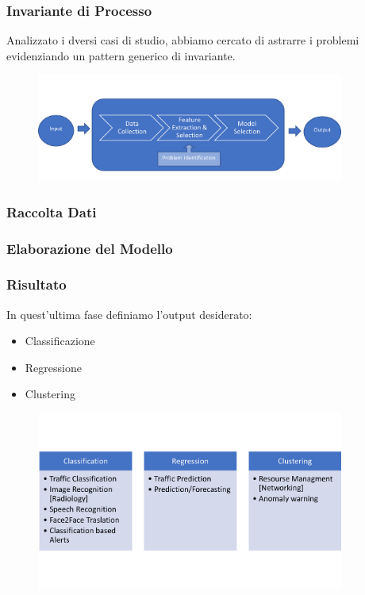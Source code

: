 \documentclass[xcolor=dvipsnames]{beamer}
\begin{document}
\begin{frame}
    \frametitle{Invariante di Processo}
    Analizzato i dversi casi di studio, abbiamo cercato di astrarre i problemi evidenziando un pattern generico di invariante.
    \begin{figure}[htbp]
        \includegraphics[width=0.9\textwidth]{Immagine3.png}
    \end{figure}
\end{frame}

\begin{frame}
    \frametitle{Raccolta Dati}
\end{frame}

\begin{frame}
    \frametitle{Elaborazione del Modello}
\end{frame}

\begin{frame}
    \frametitle{Risultato}
    In quest'ultima fase definiamo l'output desiderato:
    \begin{itemize}
        \item Classificazione
        \item Regressione 
        \item Clustering
    \end{itemize}
    \begin{figure}
        \includegraphics[width=0.9\textwidth , height=0.7\textheight]{categoryML.png}
    \end{figure}
\end{frame}
\end{document}
